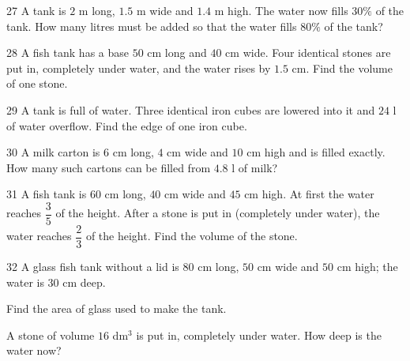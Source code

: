 \gap
\begin{probbox}{27}{\relax}
A tank is $2$ m long, $1.5$ m wide and $1.4$ m high. The water now fills $30\%$ of the tank. How many litres must be added so that the water fills $80\%$ of the tank?
\end{probbox}
\gap
\begin{probbox}{28}{\relax}
A fish tank has a base $50$ cm long and $40$ cm wide. Four identical stones are put in, completely under water, and the water rises by $1.5$ cm. Find the volume of one stone.
\end{probbox}
\gap
\begin{probbox}{29}{\relax}
A tank is full of water. Three identical iron cubes are lowered into it and $24$ l of water overflow. Find the edge of one iron cube.
\end{probbox}
\gap
\begin{probbox}{30}{\relax}
A milk carton is $6$ cm long, $4$ cm wide and $10$ cm high and is filled exactly. How many such cartons can be filled from $4.8$ l of milk?
\end{probbox}
\begin{probbox}{31}{}
A fish tank is $60$ cm long, $40$ cm wide and $45$ cm high. At first the water reaches $\dfrac35$ of the height. After a stone is put in (completely under water), the water reaches $\dfrac23$ of the height. Find the volume of the stone.
\end{probbox}
\gap
\begin{probbox}{32}{}
A glass fish tank without a lid is $80$ cm long, $50$ cm wide and $50$ cm high; the water is $30$ cm deep.\par
{} Find the area of glass used to make the tank.\par
{} A stone of volume $16$ dm$^3$ is put in, completely under water. How deep is the water now?
\end{probbox}
